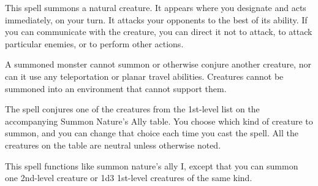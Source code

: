 \begin{multicols}{2}
\begin{small}

\noindent This spell summons a natural creature. It appears where you designate and acts immediately, on your turn. It attacks your opponents to the best of its ability. If you can communicate with the creature, you can direct it not to attack, to attack particular enemies, or to perform other actions.

\smallskip\noindent A summoned monster cannot summon or otherwise conjure another creature, nor can it use any teleportation or planar travel abilities. Creatures cannot be summoned into an environment that cannot support them.

\smallskip\noindent The spell conjures one of the creatures from the 1st-level list on the accompanying Summon Nature's Ally table. You choose which kind of creature to summon, and you can change that choice each time you cast the spell. All the creatures on the table are neutral unless otherwise noted.

\noindent This spell functions like summon nature's ally I, except that you can summon one 2nd-level creature or 1d3 1st-level creatures of the same kind.


\end{small}
\end{multicols}
